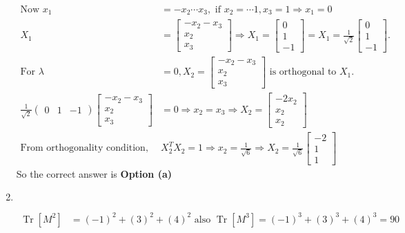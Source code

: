 \begin{enumerate}
\begin{answer}
\begin{align*}
\text{Now }
x_{1}&=-x_{2} \cdots x_{3},\text{ if }x_{2}=\cdots 1, x_{3}=1 \Rightarrow x_{1}=0\\
X_{1}&=\left[\begin{array}{c}-x_{2}-x_{3} \\ x_{2} \\ x_{3}\end{array}\right] \Rightarrow X_{1}=\left[\begin{array}{c}0 \\ 1 \\ -1\end{array}\right]=X_{1}=\frac{1}{\sqrt{2}}\left[\begin{array}{c}0 \\ 1 \\ -1\end{array}\right].\\
\text{For }\lambda&=0, X_{2}=\left[\begin{array}{c}-x_{2}-x_{3} \\ x_{2} \\ x_{3}\end{array}\right]\text{ is orthogonal to }X_{1}.\\
\frac{1}{\sqrt{2}}\left(\begin{array}{lll}0 & 1 & -1\end{array}\right)\left[\begin{array}{c}-x_{2}-x_{3} \\ x_{2} \\ x_{3}\end{array}\right]&=0 \Rightarrow x_{2}=x_{3} \Rightarrow X_{2}=\left[\begin{array}{c}-2 x_{2} \\ x_{2} \\ x_{2}\end{array}\right]\\
\text{From orthogonality condition, }&X_{2}^{T} X_{2}=1 \Rightarrow x_{2}=\frac{1}{\sqrt{6}} \Rightarrow X_{2}=\frac{1}{\sqrt{6}}\left[\begin{array}{c}-2 \\ 1 \\ 1\end{array}\right]
	\end{align*}
		So the correct answer is \textbf{Option (a)}
\end{answer}
\item $\left. \right. $
\begin{answer}
	\begin{align*}
	\operatorname{Tr}\left[M^{2}\right]&=(-1)^{2}+(3)^{2}+(4)^{2}\text{ also } \operatorname{Tr}\left[M^{3}\right]=(-1)^{3}+(3)^{3}+(4)^{3}=90

\end{align*}
\end{answer}
\end{enumerate}

